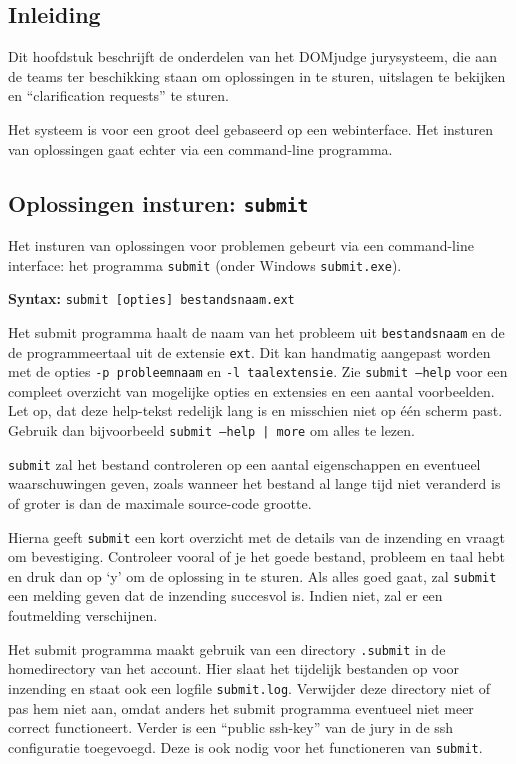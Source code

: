 \documentclass[11pt,titlepage,a4paper]{article}
\newcommand{\DOMjudge}{DOMjudge }
\begin{document}
\subsection{Inleiding}

Dit hoofdstuk beschrijft de onderdelen van het \DOMjudge
jurysysteem, die aan de teams ter beschikking staan om oplossingen in
te sturen, uitslagen te bekijken en ``clarification requests'' te
sturen.

Het systeem is voor een groot deel gebaseerd op een webinterface. Het
insturen van oplossingen gaat echter via een command-line programma.

\subsection{Oplossingen insturen: \texttt{submit}}\label{submit}

Het insturen van oplossingen voor problemen gebeurt via een
command-line interface: het programma \texttt{submit} (onder Windows
\texttt{submit.exe}).

\textbf{Syntax:} \texttt{submit [opties] bestandsnaam.ext}

Het submit programma haalt de naam van het probleem uit
\texttt{bestandsnaam} en de de programmeertaal uit de extensie
\texttt{ext}. Dit kan handmatig aangepast worden met de opties
\texttt{-p probleemnaam} en \texttt{-l taalextensie}. Zie
\texttt{submit --help} voor een compleet overzicht van mogelijke
opties en extensies en een aantal voorbeelden. Let op, dat deze help-tekst
redelijk lang is en misschien niet op \'e\'en scherm past. Gebruik dan
bijvoorbeeld \texttt{submit --help | more} om alles te lezen.

\texttt{submit} zal het bestand controleren op een aantal eigenschappen
en eventueel waarschuwingen geven, zoals wanneer het bestand al lange
tijd niet veranderd is of groter is dan de maximale source-code grootte.

Hierna geeft \texttt{submit} een kort overzicht met de details van de
inzending en vraagt om bevestiging. Controleer vooral of je het goede
bestand, probleem en taal hebt en druk dan op `y' om de oplossing in
te sturen. Als alles goed gaat, zal \texttt{submit} een melding geven
dat de inzending succesvol is. Indien niet, zal er een foutmelding
verschijnen.

Het submit programma maakt gebruik van een directory \texttt{.submit}
in de homedirectory van het account. Hier slaat het tijdelijk
bestanden op voor inzending en staat ook een logfile \texttt{submit.log}.
Verwijder deze directory niet of pas hem niet aan, omdat anders het
submit programma eventueel niet meer correct functioneert. Verder
is een ``public ssh-key'' van de jury in de ssh configuratie
toegevoegd. Deze is ook nodig voor het functioneren van \texttt{submit}.
 
\end{document}
